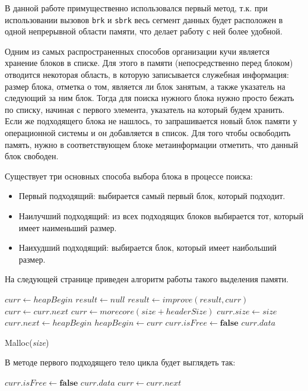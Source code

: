 В данной работе примущественно использовался первый метод, т.к. при использовании
вызовов \lstinline{brk} и \lstinline{sbrk} весь сегмент данных будет расположен 
в одной непрерывной области памяти, что делает работу с ней более удобной.  

Одним из самых распространенных способов организации кучи
является хранение блоков в списке. Для этого в памяти (непосредственно перед блоком)
отводится некоторая область, в которую записывается служебная информация:
размер блока, отметка о том, является ли блок занятым, а также указатель на 
следующий за ним блок. Тогда для поиска нужного блока нужно просто бежать по 
списку, начиная с первого элемента, указатель на который будем хранить. Если же 
подходящего блока не нашлось, то запрашивается новый блок памяти у операционной системы
и он добавляется в список. Для того чтобы освободить память, нужно в соответствующем
блоке метаинформации отметить, что данный блок свободен.

Существует три основных способа выбора блока в процессе поиска:

\begin{itemize}
\item Первый подходящий: выбирается самый первый блок, который подходит.
\item Наилучший подходящий: из всех подходящих блоков выбирается тот, который имеет наименьший размер.
\item Наихудший подходящий: выбирается блок, который имеет наибольший размер.
\end{itemize}  

На следующей странице приведен алгоритм работы такого выделения памяти.

\begin{algorithm}
\begin{algorithmic}[1]
\State $curr\gets heapBegin$
\State $result\gets null$
		\State $result\gets improve(result, curr)$				
	\EndIf
	\State $curr\gets curr.next$
\EndWhile
{}
	\State $curr\gets morecore(size + headerSize)$
	\State $curr.size\gets size$
	\State $curr.next\gets heapBegin$ 
	\State $heapBegin\gets curr$
\EndIf
\State $curr.isFree\gets \textbf{false}$
\State \Return $curr.data$
\end{algorithmic}
\caption{Malloc(\textit{size})}

В методе первого подходящего тело цикла будет выглядеть так:

\begin{algorithmic}[1]
	\State $curr.isFree\gets \textbf{false}$
	\State \Return $curr.data$
\EndIf
\State $curr\gets curr.next$
\end{algorithmic}
\end{algorithm}

